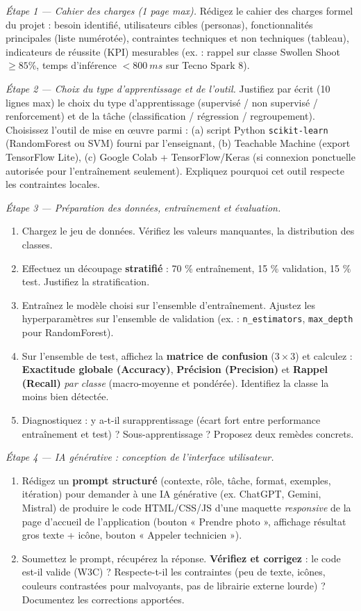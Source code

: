 \documentclass[11pt]{article}
\newcounter{popsec}
\newcounter{popsub}
\newcommand{\courssub}[1]{%
  \stepcounter{popsub}%
  \par\vspace{9pt}\noindent{\popxbold\fontsize{11.5}{13}\selectfont\color{popink}{\color{poporange}\thepopsec.\thepopsub}\hspace{6pt}#1}\par\nopagebreak\vspace{4pt}
}
\begin{document}
\courssub{Consignes}
\emph{Étape 1 — Cahier des charges (1 page max).} Rédigez le cahier des charges formel du projet : besoin identifié, utilisateurs cibles (personas), fonctionnalités principales (liste numérotée), contraintes techniques et non techniques (tableau), indicateurs de réussite (KPI) mesurables (ex. : rappel sur classe Swollen Shoot $\ge 85\%$, temps d'inférence $< \SI{800}{ms}$ sur Tecno Spark 8).

\emph{Étape 2 — Choix du type d'apprentissage et de l'outil.} Justifiez par écrit (10 lignes max) le choix du type d'apprentissage (supervisé / non supervisé / renforcement) et de la tâche (classification / régression / regroupement). Choisissez l'outil de mise en œuvre parmi : (a) script Python \texttt{scikit-learn} (RandomForest ou SVM) fourni par l'enseignant, (b) Teachable Machine (export TensorFlow Lite), (c) Google Colab + TensorFlow/Keras (si connexion ponctuelle autorisée pour l'entraînement seulement). Expliquez pourquoi cet outil respecte les contraintes locales.

\emph{Étape 3 — Préparation des données, entraînement et évaluation.}
\begin{enumerate}
    \item Chargez le jeu de données. Vérifiez les valeurs manquantes, la distribution des classes.
    \item Effectuez un découpage \textbf{stratifié} : 70 \% entraînement, 15 \% validation, 15 \% test. Justifiez la stratification.
    \item Entraînez le modèle choisi sur l'ensemble d'entraînement. Ajustez les hyperparamètres sur l'ensemble de validation (ex. : \texttt{n\_estimators}, \texttt{max\_depth} pour RandomForest).
    \item Sur l'ensemble de test, affichez la \textbf{matrice de confusion} ($3\times3$) et calculez : \textbf{Exactitude globale (Accuracy)}, \textbf{Précision (Precision)} et \textbf{Rappel (Recall)} \emph{par classe} (macro-moyenne et pondérée). Identifiez la classe la moins bien détectée.
    \item Diagnostiquez : y a-t-il surapprentissage (écart fort entre performance entraînement et test) ? Sous-apprentissage ? Proposez deux remèdes concrets.
\end{enumerate}

\emph{Étape 4 — IA générative : conception de l'interface utilisateur.}
\begin{enumerate}
    \item Rédigez un \textbf{prompt structuré} (contexte, rôle, tâche, format, exemples, itération) pour demander à une IA générative (ex. ChatGPT, Gemini, Mistral) de produire le code HTML/CSS/JS d'une maquette \emph{responsive} de la page d'accueil de l'application (bouton « Prendre photo », affichage résultat gros texte + icône, bouton « Appeler technicien »).
    \item Soumettez le prompt, récupérez la réponse. \textbf{Vérifiez et corrigez} : le code est-il valide (W3C) ? Respecte-t-il les contraintes (peu de texte, icônes, couleurs contrastées pour malvoyants, pas de librairie externe lourde) ? Documentez les corrections apportées.
\end{enumerate}
\end{document}
